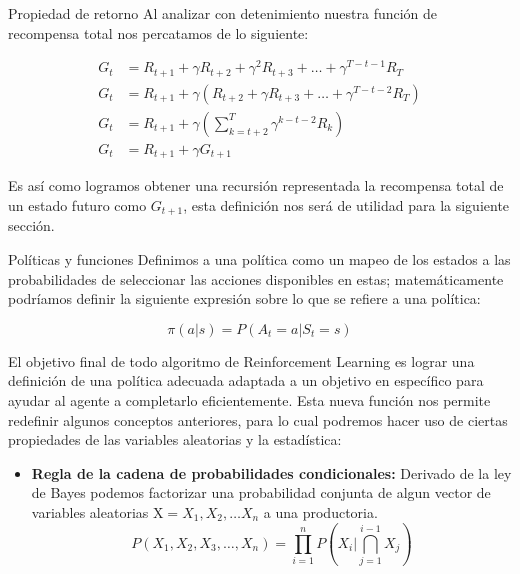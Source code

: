 \documentclass[10pt]{beamer}
\begin{document}
		\begin{frame}{Propiedad de retorno}
			Al analizar con detenimiento nuestra función de recompensa total nos percatamos de lo siguiente:

			\[
			\begin{aligned}
				G_t &= R_{t+1} + \gamma R_{t+2} + \gamma^2 R_{t+3} + \dots + \gamma^{T-t-1} R_{T} \\
				G_t &= R_{t+1} + \gamma \left( R_{t+2} + \gamma R_{t+3} + \dots + \gamma^{T-t-2} R_{T} \right) \\
				G_t &= R_{t+1} + \gamma \left( \sum_{k=t+2}^T \gamma^{k-t-2} R_k \right) \\
				G_t &= R_{t+1} + \gamma G_{t+1}
			\end{aligned}
			\]

			Es así como logramos obtener una recursión representada la recompensa total de un estado futuro como $G_{t+1}$, esta definición nos será de 
			utilidad para la siguiente sección.
		\end{frame}

		\begin{frame}{Políticas y funciones}
			Definimos a una política como un mapeo de los estados a las probabilidades de seleccionar las acciones disponibles en estas; matemáticamente podríamos definir 
			la siguiente expresión sobre lo que se refiere a una política:

			\[
			\pi(a | s) = P(A_t = a | S_t = s)
			\]

			El objetivo final de todo algoritmo de Reinforcement Learning es lograr una definición de una política adecuada adaptada a un objetivo en específico 
			para ayudar al agente a completarlo eficientemente. Esta nueva función nos permite redefinir algunos conceptos anteriores, para lo cual podremos hacer uso de ciertas propiedades
			de las variables aleatorias y la estadística:

			\begin{itemize}
				\item \textbf{Regla de la cadena de probabilidades condicionales:} Derivado de la ley de Bayes podemos factorizar una probabilidad conjunta de algun vector de variables aleatorias $\mathrm{X} = X_1, X_2, \dots X_n$ a una productoria.
				\[
				P(X_1, X_2, X_3, \dots, X_n) = \prod_{i=1}^n P \left( X_i | \bigcap_{j=1}^{i-1} X_j \right)
				\]
			\end{itemize}
		\end{frame}
\end{document}
